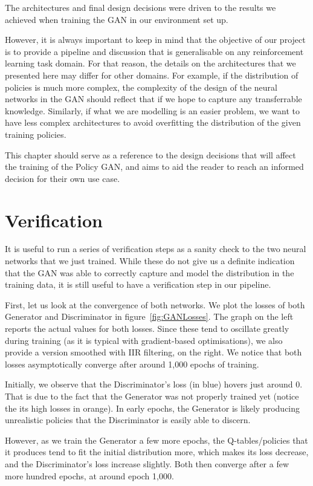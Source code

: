 The architectures and final design decisions were driven to the results we achieved when training the GAN in our environment set up.

However, it is always important to keep in mind that the objective of our project is to provide a pipeline and discussion that is generalisable on any reinforcement learning task domain. For that reason, the details on the architectures that we presented here may differ for other domains. For example, if the distribution of policies is much more complex, the complexity of the design of the neural networks in the GAN should reflect that if we hope to capture any transferrable knowledge. Similarly, if what we are modelling is an easier problem, we want to have less complex architectures to avoid overfitting the distribution of the given training policies.

This chapter should serve as a reference to the design decisions that will affect the training of the Policy GAN, and aims to aid the reader to reach an informed decision for their own use case.

\section{Verification}
It is useful to run a series of verification steps as a sanity check to the two neural networks that we just trained. While these do not give us a definite indication that the GAN was able to correctly capture and model the distribution in the training data, it is still useful to have a verification step in our pipeline.

First, let us look at the convergence of both networks. We plot the losses of both Generator and Discriminator in figure~\ref{fig:GANLosses}. The graph on the left reports the actual values for both losses. Since these tend to oscillate greatly during training (as it is typical with gradient-based optimisations), we also provide a version smoothed with IIR filtering, on the right. We notice that both losses asymptotically converge after around 1,000 epochs of training.

Initially, we observe that the Discriminator's loss (in blue) hovers just around 0. That is due to the fact that the Generator was not properly trained yet (notice the its high losses in orange). In early epochs, the Generator is likely producing unrealistic policies that the Discriminator is easily able to discern.

However, as we train the Generator a few more epochs, the Q-tables/policies that it produces tend to fit the initial distribution more, which makes its loss decrease, and the Discriminator's loss increase slightly. Both then converge after a few more hundred epochs, at around epoch 1,000.

